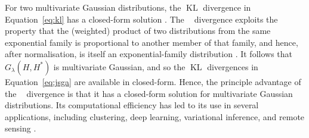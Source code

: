\documentclass[12pt,compact]{article}
\DeclareMathOperator{\KL}{KL}
\newcommand{\JSGa}{\mathop{\mathrm{JS}^{\mathrm{G}_{\lambda}}}\nolimits}
\begin{document}

For two multivariate Gaussian distributions, the $\KL{}$ divergence in Equation~\eqref{eq:kl} has a closed-form solution \citep{Duchi2007}.
The $\JSGa{}$ divergence exploits the property that the (weighted) product of two distributions from the same exponential family is proportional to another member of that family, and hence, after normalisation, is itself an exponential-family distribution \citep{Nielsen2019}.
It follows that $G_{\lambda}(H, H^*)$ is multivariate Gaussian, and so the $\KL{}$ divergences in Equation~\eqref{eq:jsga} are available in closed-form.
Hence, the principle advantage of the $\JSGa{}$ divergence is that it has a closed-form solution for multivariate Gaussian distributions.
Its computational efficiency \citep{Nielsen2019} has led to its use in several applications, including clustering, deep learning, variational inference, and remote sensing \citep{Nielsen2019, Deasy2020, Ni2023-cd, Thiagarajan2025}.
\end{document}
